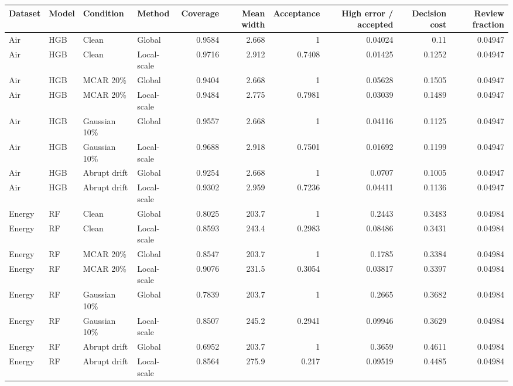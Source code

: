 \begin{tabular}{llllrrrrrr}
\toprule
Dataset & Model & Condition & Method & Coverage & Mean width & Acceptance & High error / accepted & Decision cost & Review fraction \\
\midrule
Air & HGB & Clean & Global & 0.9584 & 2.668 & 1 & 0.04024 & 0.11 & 0.04947 \\
Air & HGB & Clean & Local-scale & 0.9716 & 2.912 & 0.7408 & 0.01425 & 0.1252 & 0.04947 \\
Air & HGB & MCAR 20\% & Global & 0.9404 & 2.668 & 1 & 0.05628 & 0.1505 & 0.04947 \\
Air & HGB & MCAR 20\% & Local-scale & 0.9484 & 2.775 & 0.7981 & 0.03039 & 0.1489 & 0.04947 \\
Air & HGB & Gaussian 10\% & Global & 0.9557 & 2.668 & 1 & 0.04116 & 0.1125 & 0.04947 \\
Air & HGB & Gaussian 10\% & Local-scale & 0.9688 & 2.918 & 0.7501 & 0.01692 & 0.1199 & 0.04947 \\
Air & HGB & Abrupt drift & Global & 0.9254 & 2.668 & 1 & 0.0707 & 0.1005 & 0.04947 \\
Air & HGB & Abrupt drift & Local-scale & 0.9302 & 2.959 & 0.7236 & 0.04411 & 0.1136 & 0.04947 \\
Energy & RF & Clean & Global & 0.8025 & 203.7 & 1 & 0.2443 & 0.3483 & 0.04984 \\
Energy & RF & Clean & Local-scale & 0.8593 & 243.4 & 0.2983 & 0.08486 & 0.3431 & 0.04984 \\
Energy & RF & MCAR 20\% & Global & 0.8547 & 203.7 & 1 & 0.1785 & 0.3384 & 0.04984 \\
Energy & RF & MCAR 20\% & Local-scale & 0.9076 & 231.5 & 0.3054 & 0.03817 & 0.3397 & 0.04984 \\
Energy & RF & Gaussian 10\% & Global & 0.7839 & 203.7 & 1 & 0.2665 & 0.3682 & 0.04984 \\
Energy & RF & Gaussian 10\% & Local-scale & 0.8507 & 245.2 & 0.2941 & 0.09946 & 0.3629 & 0.04984 \\
Energy & RF & Abrupt drift & Global & 0.6952 & 203.7 & 1 & 0.3659 & 0.4611 & 0.04984 \\
Energy & RF & Abrupt drift & Local-scale & 0.8564 & 275.9 & 0.217 & 0.09519 & 0.4485 & 0.04984 \\
\bottomrule
\end{tabular}
